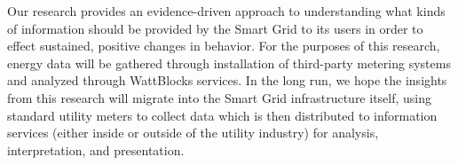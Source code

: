 Our research provides an evidence-driven approach to understanding what
kinds of information should be provided by the Smart Grid to its users in
order to effect sustained, positive changes in behavior.  For the purposes
of this research, energy data will be gathered through installation of
third-party metering systems and analyzed through WattBlocks services. In
the long run, we hope the insights from this research will migrate into the Smart
Grid infrastructure itself, using standard utility meters to collect data
which is then distributed to information services (either inside or outside
of the utility industry) for analysis, interpretation, and presentation.
